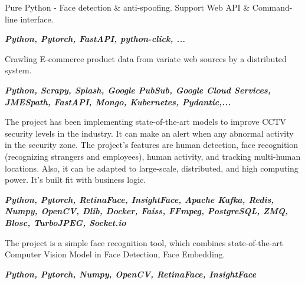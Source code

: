 \documentclass[10pt,a4paper,ragged2e,withhyper]{altacv}
\begin{document}
\divider

\medskip
{}
\begin{minipage}{\linewidth}
	\justifying
	Pure Python - Face detection \& anti-spoofing. Support Web API \& Command-line interface.
	
	\textit{\textbf{Python, Pytorch, FastAPI, python-click, ...}}
	
\end{minipage}

\divider

\medskip
{}
\begin{minipage}{\linewidth}
	\justifying
	Crawling E-commerce product data from variate web sources by a distributed system.
	
	\textit{\textbf{Python, Scrapy, Splash, Google PubSub, Google Cloud Services, JMESpath, FastAPI, Mongo, Kubernetes, Pydantic,...}}
	
\end{minipage}

\medskip

\divider

\medskip

\begin{minipage}{\linewidth}
	\justifying
	
	The project has been implementing state-of-the-art models to improve CCTV security levels in the industry. It can make an alert when any abnormal activity in the security zone. The project's features are human detection, face recognition (recognizing strangers and employees), human activity, and tracking multi-human locations. Also, it can be adapted to large-scale, distributed, and high computing power.
	\smallskip
	It's built fit with business logic.
	
	\textit{\textbf{Python, Pytorch, RetinaFace, InsightFace, Apache Kafka, Redis, Numpy, OpenCV, Dlib, Docker, Faiss, FFmpeg, PostgreSQL, ZMQ, Blosc, TurboJPEG, Socket.io}}
\end{minipage}

\medskip

\divider

\medskip


\begin{minipage}{\linewidth}
\justifying
The project is a simple face recognition tool, which combines state-of-the-art Computer Vision Model in Face Detection, Face Embedding.
\smallskip

\textit{\textbf{Python, Pytorch, Numpy, OpenCV, RetinaFace, InsightFace}}
\end{minipage}
\end{document}
